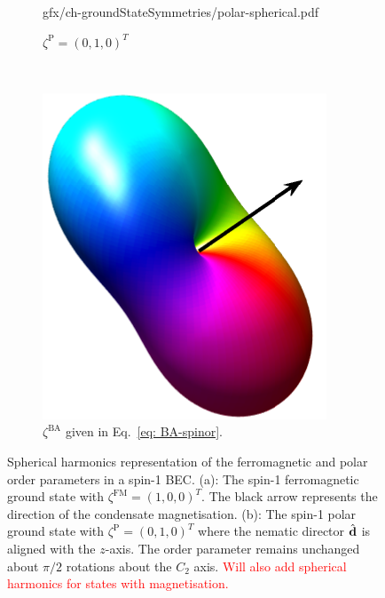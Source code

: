 \begin{figure}
\begin{subfigure}{0.49\textwidth}
        {gfx/ch-groundStateSymmetries/polar-spherical.pdf}
        \caption{\label{subfig: spin-1-polar-spherical}
        \(\zeta^\mathrm{P}={(0, 1, 0)}^T\)}
    \end{subfigure}\\
    \begin{subfigure}{0.49\textwidth}
        \includegraphics[width=\textwidth]
        {gfx/ch-groundStateSymmetries/BA-spherical.pdf}
        \caption{\label{subfig: spin-1-BA-spherical}
            \(\zeta^\mathrm{BA}\) given in Eq.~\eqref{eq: BA-spinor}.}
    \end{subfigure}
    \caption[Spherical harmonic representation of spin-1 ground states]
    {\label{fig: spin-1-spherical-harmonics}
    Spherical harmonics representation of the ferromagnetic and polar order
    parameters in a spin-1 BEC.\@
    (a): The spin-1 ferromagnetic ground state with
    \(\zeta^\mathrm{FM}={(1, 0, 0)}^T\).
    The black arrow represents the direction of the condensate magnetisation.
    (b): The spin-1 polar ground state with
    \(\zeta^\mathrm{P}={(0, 1, 0)}^T\) where the nematic director
    \(\hat{\vb{d}}\) is aligned with the \(z\)-axis.
    The order parameter remains unchanged about \(\pi/2\) rotations about the
    \(C_2\) axis.
    \textcolor{red}{Will also add spherical harmonics for states with
        magnetisation.}}
\end{figure}

